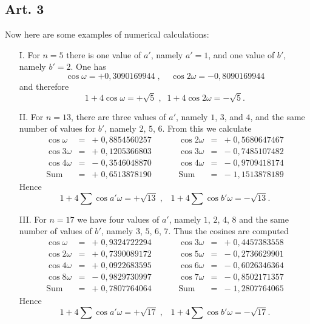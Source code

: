 \documentclass{book}
\theoremstyle{plain}
\theoremstyle{remark}
\begin{document}
\subsection*{Art. 3}
Now here are some examples of numerical calculations:
\begin{enumerate}
\item[I.] For $n=5$ there is one value of $a'$, namely $a' = 1$, and one value of $b'$, namely $b' = 2$.  One has
\[ \cos \omega = + 0,3090169944 \; , \; \; \; \; \cos 2 \omega = - 0,8090169944 \]
and therefore 
\[ 1 + 4 \cos \omega = + \sqrt{5} \;, \; \; 1 + 4 \cos 2\omega = -\sqrt{5} .\]
\item[II.] For $n=13$, there are three values of $a'$, namely $1$, $3$, and $4$, and the same number of values for $b'$, namely $2$, $5$, $6$.  From this we calculate
\[ \begin{array}{llr} \cos \omega &=& +\; 0,8854560257 \\ \cos 3\omega &=& +\; 0,1205366803 \\ \cos 4 \omega &=& -\;0,3546048870 \\  \hline \textrm{Sum} &=& +\; 0,6513878190 \end{array} 
 \hspace{1cm} \begin{array}{llr} \cos 2\omega &=& +\; 0,5680647467 \\ \cos 3\omega &=& -\; 0,7485107482 \\ \cos 4 \omega &=& -\;0,9709418174 \\  \hline \textrm{Sum} &=& -\; 1,1513878189 \end{array} 
\]
Hence
\[ 1 + 4 \sum \cos a'\omega = +\sqrt{13} \;, \; \; \; 1 + 4 \sum \cos b' \omega = - \sqrt{13}. \]

\item[III.] For $n=17$ we have four values of $a'$, namely $1$, $2$, $4$, $8$ and the same number of values of $b'$, namely $3$, $5$, $6$, $7$.  Thus the cosines are computed
\[ \begin{array}{llr} \cos \omega &=& +\; 0,9324722294 \\ 
\cos 2\omega &=&  +\;0,7390089172\\ 
\cos 4 \omega &=& +\;0,0922683595 \\ 
\cos 8 \omega &=&  -\; 0,9829730997 \\  \hline 
\textrm{Sum} &=& +\; 0,7807764064  \end{array} 
 \hspace{1cm} 
 \begin{array}{llr} \cos 3 \omega &=& +\; 0,4457383558\\ 
 \cos 5\omega &=& -\; 0,2736629901 \\ 
 \cos 6 \omega &=& -\;0,6026346364 \\  
 \cos 7 \omega &=& -\;0,8502171357 \\  
 \hline \textrm{Sum} &=& -\; 1,2807764065 \end{array} 
\]
Hence
\[ 1 + 4 \sum \cos a'\omega = +\sqrt{17} \;, \; \; \; 1 + 4 \sum \cos b' \omega = - \sqrt{17}. \]


\end{enumerate}
\end{document}
